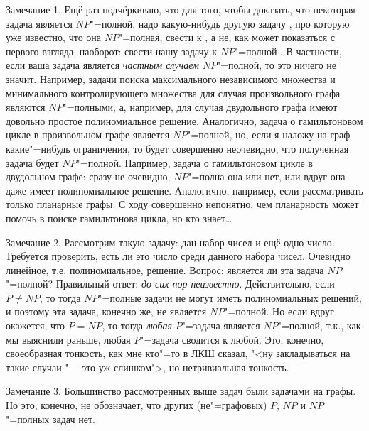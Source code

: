 {Замечание 1. Ещё раз подчёркиваю, что для того, чтобы доказать, что некоторая 
задача \A{} является $NP$"=полной, надо какую-нибудь другую задачу \B, про 
которую уже известно, что она $NP$"=полная, свести к \A, а не, как может 
показаться с первого взгляда, наоборот: свести нашу задачу \A{} к $NP$"=полной 
\B. В частности, если ваша задача является \textit{частным случаем} 
$NP$"=полной, то это ничего не значит. Например, задачи поиска максимального 
независимого множества и минимального контролирующего множества для случая 
произвольного графа являются $NP$"=полными, а, например, для случая двудольного 
графа имеют довольно простое полиномиальное решение. Аналогично, задача о 
гамильтоновом цикле в произвольном графе является $NP$"=полной, но, если я 
наложу на граф какие"=нибудь ограничения, то будет совершенно неочевидно, что 
полученная задача будет $NP$"=полной. Например, задача о гамильтоновом цикле в 
двудольном графе: сразу не очевидно, $NP$"=полна она или нет, или вдруг она 
даже имеет полиномиальное решение. Аналогично, например, если рассматривать только 
планарные графы. С ходу совершенно непонятно, чем планарность может помочь в 
поиске гамильтонова цикла, но кто знает\dots

Замечание 2. Рассмотрим такую задачу: дан набор чисел и ещё одно число. 
Требуется проверить, есть ли это число среди данного набора чисел. Очевидно 
линейное, т.е. полиномиальное, решение. Вопрос: является ли эта задача 
$NP$"=полной? Правильный ответ: \textit{до сих пор неизвестно}. Действительно, 
если $P\neq NP$, то тогда $NP$"=полные задачи не могут иметь полиномиальных 
решений, и поэтому эта задача, конечно же, не является $NP$"=полной. Но если 
вдруг окажется, что $P=NP$, то тогда \textit{любая} $P$"=задача является 
$NP$"=полной, т.к., как мы выяснили раньше, любая $P$"=задача сводится к любой. 
Это, конечно, своеобразная тонкость, как мне кто"=то в ЛКШ сказал, "<ну 
закладываться на такие случаи "--- это уж слишком">, но нетривиальная тонкость.

Замечание 3. Большинство рассмотренных выше задач были задачами на графы. Но 
это, конечно, не обозначает, что других (не"=графовых) $P$, $NP$ и $NP$"=полных задач нет.

}

